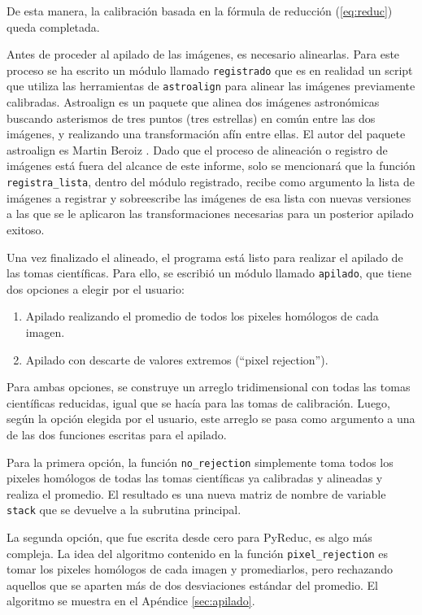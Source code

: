 \documentclass[a4paper, 12pt]{article}
\begin{document}
De esta manera, la calibración basada en la fórmula de reducción (\ref{eq:reduc}) queda completada.

Antes de proceder al apilado de las imágenes, es necesario alinearlas. Para este proceso se ha escrito un módulo llamado \texttt{registrado} que es en realidad un script que utiliza las herramientas de \texttt{astroalign} para alinear las imágenes previamente calibradas. Astroalign es un paquete que alinea dos imágenes astronómicas buscando asterismos de tres puntos (tres estrellas) en común entre las dos imágenes, y
realizando una transformación afín entre ellas. El autor del paquete astroalign es Martin Beroiz \cite{astroalign}. Dado que el proceso de alineación o registro de imágenes está fuera del alcance de este informe, solo se mencionará que la función \texttt{registra\_lista}, dentro del módulo registrado, recibe como argumento la lista de imágenes a registrar y sobreescribe las imágenes de esa lista con nuevas versiones a las que se le aplicaron las transformaciones necesarias para un posterior apilado exitoso.

Una vez finalizado el alineado, el programa está listo para realizar el apilado de las tomas científicas. Para ello, se escribió un módulo llamado \texttt{apilado}, que tiene dos opciones a elegir por el usuario:
\begin{enumerate}
\item Apilado realizando el promedio de todos los pixeles homólogos de cada imagen.
\item Apilado con descarte de valores extremos (``pixel rejection'').
\end{enumerate}

Para ambas opciones, se construye un arreglo tridimensional con todas las tomas científicas reducidas, igual que se hacía para las tomas de calibración. Luego, según la opción elegida por el usuario, este arreglo se pasa como argumento a una de las dos funciones escritas para el apilado.

Para la primera opción, la función \texttt{no\_rejection} simplemente toma todos los pixeles homólogos de todas las tomas científicas ya calibradas y alineadas y realiza el promedio. El resultado es una nueva matriz de nombre de variable \texttt{stack} que se devuelve a la subrutina principal.

La segunda opción, que fue escrita desde cero para PyReduc, es algo más compleja. La idea del algoritmo contenido en la función \texttt{pixel\_rejection} es tomar los pixeles homólogos de cada imagen y promediarlos, pero rechazando aquellos que se aparten más de dos desviaciones estándar del promedio. El algoritmo se muestra en el Apéndice \ref{sec:apilado}.
\end{document}
